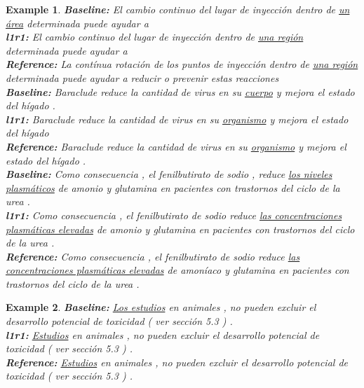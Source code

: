 \documentclass[smallextended]{svjour3}       %
\theoremstyle{break}
\newtheorem{exmp}{Example}[section]
\begin{document}
\begin{exmp}
\footnotesize
\label{ex:QAsynonym}
\textbf{Baseline:} El cambio continuo del lugar de inyección dentro de \underline{un área} determinada puede ayudar a \\
\textbf{l1r1:} El cambio continuo del lugar de inyección dentro de \underline{una región} determinada puede ayudar a \\
\textbf{Reference:} La contínua rotación de los puntos de inyección dentro de \underline{una región} determinada puede ayudar a reducir o prevenir estas reacciones \\
\noindent\makebox[\linewidth]{\rule{\linewidth}{0.4pt}}
\textbf{Baseline:} Baraclude reduce la cantidad de virus en su \underline{cuerpo} y mejora el estado del hígado . \\
\textbf{l1r1:} Baraclude reduce la cantidad de virus en su \underline{organismo} y mejora el estado del hígado  \\
\textbf{Reference:} Baraclude reduce la cantidad de virus en su \underline{organismo} y mejora el estado del hígado .
\\ 
\noindent\makebox[\linewidth]{\rule{\linewidth}{0.4pt}}
\textbf{Baseline:} Como consecuencia , el fenilbutirato de sodio , reduce \underline{los niveles plasmáticos} de amonio y glutamina en pacientes con trastornos del ciclo de la urea . \\
\textbf{l1r1:} Como consecuencia , el fenilbutirato de sodio reduce \underline{las concentraciones plasmáticas elevadas} de amonio y glutamina en pacientes con trastornos del ciclo de la urea .  \\
\textbf{Reference:} Como consecuencia , el fenilbutirato de sodio reduce \underline{las concentraciones plasmáticas elevadas} de amoníaco y glutamina en pacientes con trastornos del ciclo de la urea .
\end{exmp}

\begin{exmp}
\footnotesize
\label{ex:QAdrop}
\textbf{Baseline:} \underline{Los estudios} en animales , no pueden excluir el desarrollo potencial de toxicidad ( ver sección 5.3 ) . \\
\textbf{l1r1:} \underline{Estudios} en animales , no pueden excluir el desarrollo potencial de toxicidad ( ver sección 5.3 ) . \\
\textbf{Reference:} \underline{Estudios} en animales , no pueden excluir el desarrollo potencial de toxicidad ( ver sección 5.3 ) .
\end{exmp}
\end{document}
